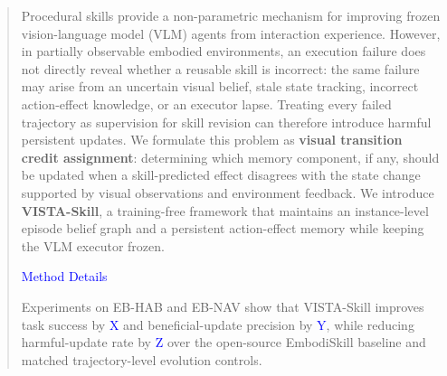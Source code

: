 \begin{abstract}
Procedural skills provide a non-parametric mechanism for improving frozen vision-language model (VLM) agents from interaction experience. However, in partially observable embodied environments, an execution failure does not directly reveal whether a reusable skill is incorrect: the same failure may arise from an uncertain visual belief, stale state tracking, incorrect action-effect knowledge, or an executor lapse. Treating every failed trajectory as supervision for skill revision can therefore introduce harmful persistent updates. We formulate this problem as \textbf{visual transition credit assignment}: determining which memory component, if any, should be updated when a skill-predicted effect disagrees with the state change supported by visual observations and environment feedback. We introduce \textbf{VISTA-Skill}, a training-free framework that maintains an instance-level episode belief graph and a persistent action-effect memory while keeping the VLM executor frozen. 

\textcolor{blue}{Method Details}

Experiments on EB-HAB and EB-NAV show that VISTA-Skill improves task success by \textcolor{blue}{X} and beneficial-update precision by \textcolor{blue}{Y}, while reducing harmful-update rate by \textcolor{blue}{Z} over the open-source EmbodiSkill baseline and matched trajectory-level evolution controls.
\end{abstract}
